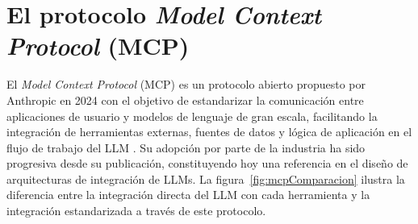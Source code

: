 \section{El protocolo \textit{Model Context Protocol} (MCP)}
\label{sec:mcp}


El \textit{Model Context Protocol} (MCP) es un protocolo abierto propuesto por Anthropic en 2024 con el objetivo de estandarizar la comunicación entre aplicaciones de usuario y modelos de lenguaje de gran escala, facilitando la integración de herramientas externas, fuentes de datos y lógica de aplicación en el flujo de trabajo del LLM \cite{anthropic2024mcp}. Su adopción por parte de la industria ha sido progresiva desde su publicación, constituyendo hoy una referencia en el diseño de arquitecturas de integración de LLMs. La figura~\ref{fig:mcpComparacion} ilustra la diferencia entre la integración directa del LLM con cada herramienta y la integración estandarizada a través de este protocolo.

